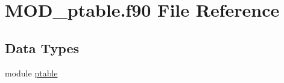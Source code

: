 \hypertarget{MOD__ptable_8f90}{\section{M\-O\-D\-\_\-ptable.\-f90 File Reference}
\label{MOD__ptable_8f90}
}
\subsection*{Data Types}
\begin{DoxyCompactItemize}
\item 
module \hyperlink{classptable}{ptable}
\end{DoxyCompactItemize}
